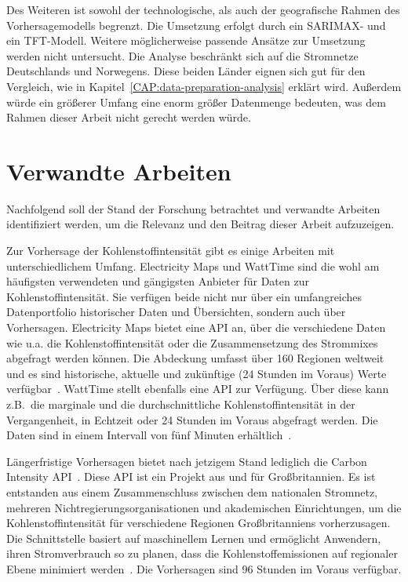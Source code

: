 
Des Weiteren ist sowohl der technologische, als auch der geografische Rahmen des Vorhersagemodells begrenzt.
Die Umsetzung erfolgt durch ein \ac{SARIMAX}- und ein \ac{TFT}-Modell.
Weitere möglicherweise passende Ansätze zur Umsetzung werden nicht untersucht.
Die Analyse beschränkt sich auf die Stromnetze Deutschlands und Norwegens.
Diese beiden Länder eignen sich gut für den Vergleich, wie in Kapitel~\ref{CAP:data-preparation-analysis} erklärt wird.
Außerdem würde ein größerer Umfang eine enorm größer Datenmenge bedeuten, was dem Rahmen dieser Arbeit nicht gerecht werden würde.

\section{Verwandte Arbeiten}
Nachfolgend soll der Stand der Forschung betrachtet und verwandte Arbeiten identifiziert werden, um die Relevanz und den Beitrag dieser Arbeit aufzuzeigen.

Zur Vorhersage der Kohlenstoffintensität gibt es einige Arbeiten mit unterschiedlichem Umfang.
Electricity Maps und WattTime sind die wohl am häufigsten verwendeten und gängigsten Anbieter für Daten zur Kohlenstoffintensität.
Sie verfügen beide nicht nur über ein umfangreiches Datenportfolio historischer Daten und Übersichten, sondern auch über Vorhersagen.
Electricity Maps bietet eine \ac{API} an, über die verschiedene Daten wie u.a. die Kohlenstoffintensität oder die Zusammensetzung des Strommixes abgefragt werden können.
Die Abdeckung umfasst über 160 Regionen weltweit und es sind historische, aktuelle und zukünftige (24 Stunden im Voraus) Werte verfügbar~\cite{ElectricityMaps.20231220T09:16:49.000Z}.
WattTime stellt ebenfalls eine \ac{API} zur Verfügung.
Über diese kann z.B.\ die marginale und die durchschnittliche Kohlenstoffintensität in der Vergangenheit, in Echtzeit oder 24 Stunden im Voraus abgefragt werden.
Die Daten sind in einem Intervall von fünf Minuten erhältlich~\cite{WattTime.20231130T19:28:06+00:00}.

Längerfristige Vorhersagen bietet nach jetzigem Stand lediglich die Carbon Intensity \ac{API}~\cite{LyndonRuff.20220420T15:34:17.000Z}.
Diese \ac{API} ist ein Projekt aus und für Großbritannien.
Es ist entstanden aus einem Zusammenschluss zwischen dem nationalen Stromnetz, mehreren Nichtregierungsorganisationen und akademischen Einrichtungen, um die Kohlenstoffintensität für verschiedene Regionen Großbritanniens vorherzusagen.
Die Schnittstelle basiert auf maschinellem Lernen und ermöglicht Anwendern, ihren Stromverbrauch so zu planen, dass die Kohlenstoffemissionen auf regionaler Ebene minimiert werden~\cite{Currie.2024}.
Die Vorhersagen sind 96 Stunden im Voraus verfügbar.

